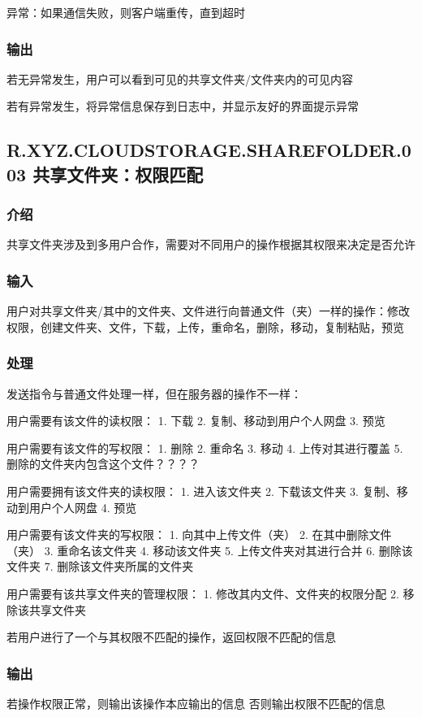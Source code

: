 异常：如果通信失败，则客户端重传，直到超时
 
\subsubsection{输出} 
若无异常发生，用户可以看到可见的共享文件夹/文件夹内的可见内容

若有异常发生，将异常信息保存到日志中，并显示友好的界面提示异常


\subsection{R.XYZ.CLOUDSTORAGE.SHAREFOLDER.003 共享文件夹：权限匹配}
 
\subsubsection{介绍}
共享文件夹涉及到多用户合作，需要对不同用户的操作根据其权限来决定是否允许

\subsubsection{输入} 
用户对共享文件夹/其中的文件夹、文件进行向普通文件（夹）一样的操作：修改权限，创建文件夹、文件，下载，上传，重命名，删除，移动，复制粘贴，预览

\subsubsection{处理} 
发送指令与普通文件处理一样，但在服务器的操作不一样：

用户需要有该文件的读权限：
1. 下载
2. 复制、移动到用户个人网盘
3. 预览

用户需要有该文件的写权限：
1. 删除
2. 重命名
3. 移动
4. 上传对其进行覆盖
5. 删除的文件夹内包含这个文件？？？？

用户需要拥有该文件夹的读权限：
1. 进入该文件夹
2. 下载该文件夹
3. 复制、移动到用户个人网盘
4. 预览

用户需要有该文件夹的写权限：
1. 向其中上传文件（夹）
2. 在其中删除文件（夹）
3. 重命名该文件夹
4. 移动该文件夹
5. 上传文件夹对其进行合并
6. 删除该文件夹
7. 删除该文件夹所属的文件夹

用户需要有该共享文件夹的管理权限：
1. 修改其内文件、文件夹的权限分配
2. 移除该共享文件夹

若用户进行了一个与其权限不匹配的操作，返回权限不匹配的信息

\subsubsection{输出} 
若操作权限正常，则输出该操作本应输出的信息
否则输出权限不匹配的信息


